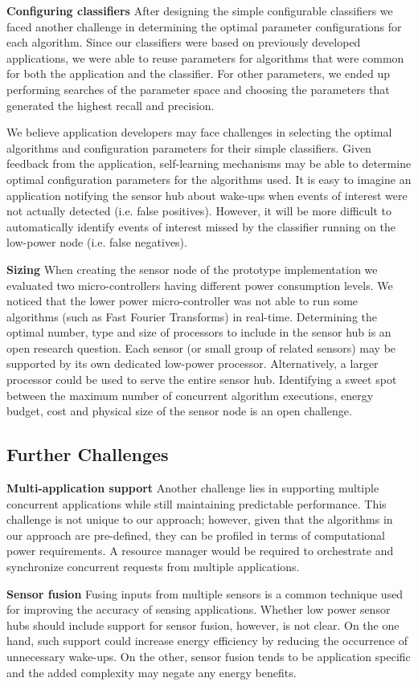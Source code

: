 {\bf Configuring classifiers} After designing the simple 
configurable classifiers we faced another challenge in determining 
the optimal parameter configurations for each algorithm.  Since our
classifiers were based on previously developed applications, we were
able to reuse parameters for algorithms that were common for both the
application and the classifier.  For other parameters, we ended up
performing searches of the parameter space and choosing the parameters
that generated the highest recall and precision.

We believe application developers may
face challenges in selecting the optimal algorithms and configuration
parameters for their simple classifiers.  Given feedback from the
application, self-learning mechanisms may be able to determine optimal
configuration parameters for the algorithms used.  It is easy to 
imagine an application notifying the
sensor hub about wake-ups when events of interest were not actually
detected (i.e. false positives).  However, it will be more difficult
to automatically identify events of interest missed by the classifier
running on the low-power node (i.e. false negatives).

{\bf Sizing} When creating the sensor node of the prototype 
implementation we evaluated two micro-controllers having 
different power consumption levels.  We noticed that the lower 
power micro-controller was not able to run some algorithms (such
as Fast Fourier Transforms) in real-time. Determining the optimal 
number, type and size of
processors to include in the sensor hub is an open research question.
Each sensor (or small group of related sensors) may be supported by
its own dedicated low-power processor.  Alternatively, a larger
processor could be used to serve the entire sensor hub.  Identifying a
sweet spot between the maximum number of concurrent algorithm
executions, energy budget, cost and physical size of the sensor node
is an open challenge.


\subsection{Further Challenges}
\label{sec:furtherChallenges}

{\bf Multi-application support} Another challenge lies in supporting
multiple concurrent applications while still maintaining predictable
performance.  This challenge is not unique to our approach; however,
given that the algorithms in our approach are pre-defined, they can be
profiled in terms of computational power requirements.  A resource
manager would be required to orchestrate and synchronize concurrent
requests from multiple applications.

{\bf Sensor fusion} Fusing inputs from multiple sensors is a common
technique used for improving the accuracy of sensing applications.
Whether low power sensor hubs should include support for sensor
fusion, however, is not clear.  On the one hand, such support could
increase energy efficiency by reducing the occurrence of unnecessary
wake-ups.  On the other, sensor fusion tends to be application specific
and the added complexity may negate any energy benefits.
